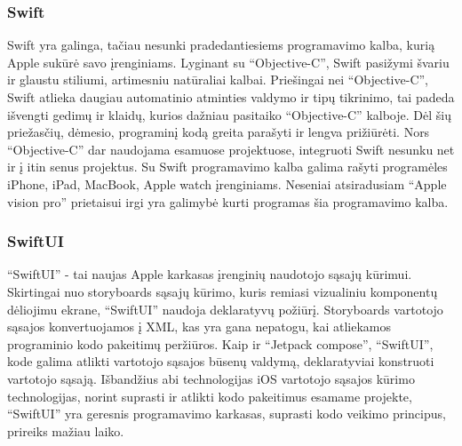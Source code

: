 \subsubsection{Swift}
Swift yra galinga, tačiau nesunki pradedantiesiems programavimo kalba, kurią Apple sukūrė savo įrenginiams. Lyginant su \enquote{Objective-C}, Swift pasižymi švariu ir glaustu stiliumi, artimesniu natūraliai kalbai. Priešingai nei \enquote{Objective-C}, Swift atlieka daugiau automatinio atminties valdymo ir tipų tikrinimo, tai padeda išvengti gedimų ir klaidų, kurios dažniau pasitaiko \enquote{Objective-C} kalboje. Dėl šių priežasčių, dėmesio, programinį kodą  greita parašyti ir lengva prižiūrėti. Nors \enquote{Objective-C} dar naudojama esamuose projektuose, integruoti Swift nesunku net ir į itin senus projektus. Su Swift programavimo kalba galima rašyti programėles iPhone, iPad, MacBook, Apple watch įrenginiams. Neseniai atsiradusiam \enquote{Apple vision pro} prietaisui irgi yra galimybė kurti programas šia programavimo kalba. 

\subsubsection{SwiftUI}

\enquote{SwiftUI} - tai naujas Apple karkasas įrenginių naudotojo sąsajų kūrimui. Skirtingai nuo storyboards sąsajų kūrimo, kuris remiasi vizualiniu komponentų dėliojimu ekrane, \enquote{SwiftUI} naudoja deklaratyvų požiūrį. Storyboards vartotojo sąsajos konvertuojamos į XML,  kas yra gana nepatogu, kai atliekamos programinio kodo pakeitimų peržiūros. Kaip ir \enquote{Jetpack compose}, \enquote{SwiftUI}, kode galima atlikti vartotojo sąsajos būsenų valdymą, deklaratyviai konstruoti vartotojo sąsają. Išbandžius abi technologijas iOS vartotojo sąsajos kūrimo technologijas, norint suprasti ir atlikti kodo pakeitimus esamame projekte, \enquote{SwiftUI} yra geresnis programavimo karkasas, suprasti kodo veikimo principus, prireiks mažiau laiko.